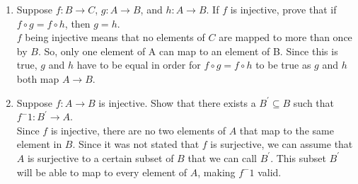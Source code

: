 \documentclass{article}
\begin{document}
\begin{enumerate}
\item Suppose $f: B \to C$, $g: A \to B$, and $h: A \to B$. If $f$ is injective, prove that if $f \circ g = f \circ h$, then $g=h$.  \\
    $f$ being injective means that no elements of $C$ are mapped to more than once by $B$. So, only one element of A can map to an element of B. Since this is true, $g$ and $h$ have to be equal in order for $f \circ g = f \circ h$ to be true as $g$ and $h$ both map $A \to B$.
\item Suppose $f: A \to B$ is injective. Show that there exists a $B^\prime \subseteq B$ such that $f^-1 : B^\prime \to A$. \\
    Since $f$ is injective, there are no two elements of $A$ that map to the same element in $B$. Since it was not stated that $f$ is surjective, we can assume that $A$ is surjective to a certain subset of $B$ that we can call $B^\prime$. This subset $B^\prime$ will be able to map to every element of $A$, making $f^-1$ valid.
\end{enumerate}
\end{document}

